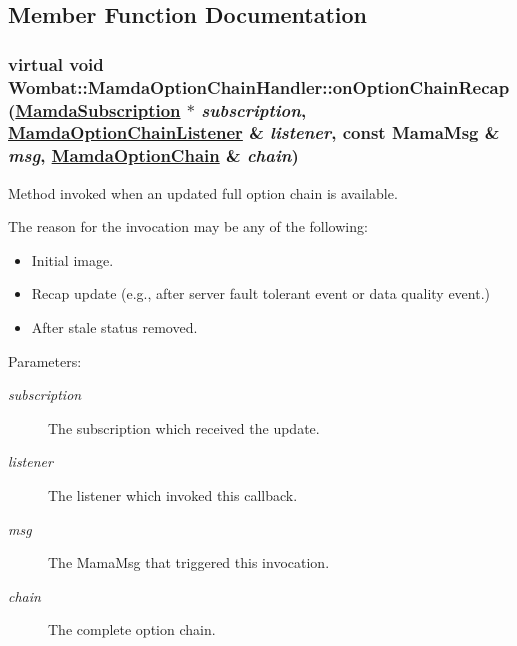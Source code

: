 \subsection{Member Function Documentation}
\hypertarget{classWombat_1_1MamdaOptionChainHandler_be6d7d71f55b09f40273a1ee5120f260}{
\subsubsection[onOptionChainRecap]{\setlength{\rightskip}{0pt plus 5cm}virtual void Wombat::Mamda\-Option\-Chain\-Handler::on\-Option\-Chain\-Recap (\hyperlink{classWombat_1_1MamdaSubscription}{Mamda\-Subscription} $\ast$ {\em subscription}, \hyperlink{classWombat_1_1MamdaOptionChainListener}{Mamda\-Option\-Chain\-Listener} \& {\em listener}, const Mama\-Msg \& {\em msg}, \hyperlink{classWombat_1_1MamdaOptionChain}{Mamda\-Option\-Chain} \& {\em chain})}}
\label{classWombat_1_1MamdaOptionChainHandler_be6d7d71f55b09f40273a1ee5120f260}


Method invoked when an updated full option chain is available. 

The reason for the invocation may be any of the following:\begin{itemize}
\item Initial image.\item Recap update (e.g., after server fault tolerant event or data quality event.)\item After stale status removed.\end{itemize}


\begin{Desc}
\item[Parameters:]
\begin{description}
\item[{\em subscription}]The subscription which received the update. \item[{\em listener}]The listener which invoked this callback. \item[{\em msg}]The Mama\-Msg that triggered this invocation. \item[{\em chain}]The complete option chain. \end{description}
\end{Desc}


